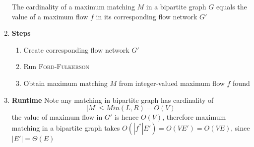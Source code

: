 \documentclass[11pt]{article}
\begin{document}
\begin{defn*}
\begin{enumerate}
        \begin{corollary*}
            The cardinality of a maximum matching $M$ in a bipartite graph $G$ equals the value of a maximum flow $f$ in its corresponding flow network $G'$
        \end{corollary*}
        \item \textbf{Steps}
        \begin{enumerate}
            \item Create corresponding flow network $G'$ 
            \item Run \textsc{Ford-Fulkerson} 
            \item Obtain maximum matching $M$ from integer-valued maximum flow $f$ found
        \end{enumerate}  
        \item \textbf{Runtime} Note any matching in bipartite graph has cardinality of 
        \[
            |M| \leq Min(L, R) = O(V)
        \]
        the value of maximum flow in $G'$ is hence $O(V)$, therefore maximum matching in a bipartite graph takes $O(|f^*|E') = O(VE') = O(VE)$, since $|E'| = \Theta(E)$
    \end{enumerate}
\end{defn*}
\end{document}
